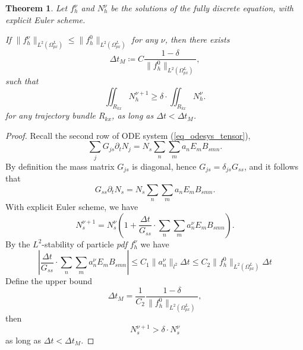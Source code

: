 \documentclass{article}
\newtheorem{theorem}{Theorem}
\numberwithin{equation}{section}
\begin{document}
\begin{theorem}
    Let $f^{\nu}_{h}$ and $N^{\nu}_{h}$ be the solutions of the fully discrete equation, with explicit Euler scheme.

    If $\lVert f_{h}^{\nu}\rVert_{L^{2}(\Omega_{px}^{L})}\leq\lVert f_{h}^{0}\rVert_{L^{2}(\Omega_{px}^{L})}$ for any $\nu$, then there exists
    \begin{equation*}
        \Delta t_{M}\coloneqq C\frac{1-\delta}{\lVert f_{h}^{0}\rVert_{L^{2}(\Omega_{px}^{L})}},
    \end{equation*}
    such that
    \begin{equation*}
        \iint_{R_{kx}}N_{h}^{\nu+1}\geq\delta \cdot \iint_{R_{kx}}N_{h}^{\nu}.
    \end{equation*}
    for any trajectory bundle $R_{kx}$, as long as $\Delta t < \Delta t_{M}$.
\end{theorem}
\begin{proof}
    Recall the second row of ODE system (\ref{eq_odesys_tensor}),
    \begin{equation*}
        \sum_{j}G_{js}\partial_{t}N_{j}=N_{s}\sum_{n}\sum_{m}a_{n}E_{m}B_{smn}.
    \end{equation*}
    By definition the mass matrix $G_{js}$ is diagonal, hence $G_{js}= \delta_{js} G_{ss}$, and it follows that
    \begin{equation*}
        G_{ss}\partial_{t}N_{s}=N_{s}\sum_{n}\sum_{m}a_{n}E_{m}B_{smn}.
    \end{equation*}
    With explicit Euler scheme, we have
    \begin{equation*}
        N_{s}^{\nu+1}=N_{s}^{\nu}\left(1+\frac{\Delta t}{G_{ss}}\cdot\sum_{n}\sum_{m}a^{\nu}_{n}E_{m}B_{smn}\right).
    \end{equation*}
    By the $L^2$-stability of particle \textit{pdf} $f^{\nu}_{h}$ we have
    \begin{equation*}
        \left\vert\frac{\Delta t}{G_{ss}}\cdot\sum_{n}\sum_{m}a_{n}^{\nu}E_{m}B_{smn}\right\vert\leq C_{1}\lVert a_{n}^{\nu}\rVert_{l^{2}}\Delta t\leq C_{2}\lVert f_{h}^{0}\rVert_{L^{2}(\Omega_{px}^{L})}\Delta t
    \end{equation*}
    Define the upper bound
    \begin{equation*}
        \Delta t_{M}=\frac{1}{C_{2}}\frac{1-\delta}{\lVert f_{h}^{0}\rVert_{L^{2}(\Omega_{px}^{L})}},
    \end{equation*}
    then
    \begin{equation*}
        N_{s}^{\nu+1} > \delta \cdot N_{s}^{\nu}
    \end{equation*}
    as long as $\Delta t < \Delta t_{M}$.
\end{proof}
\end{document}
